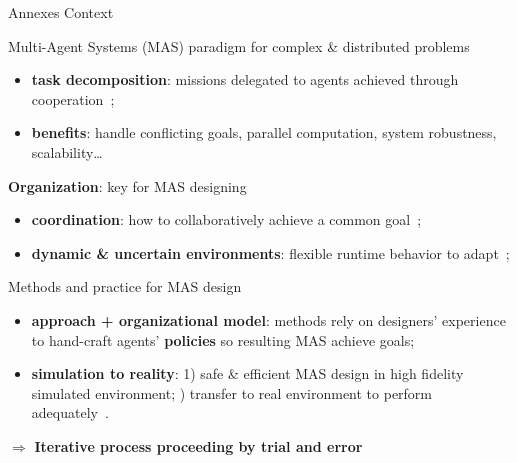 \begin{frame}{Annexes}
    {Context}

    \begin{block}{Multi-Agent Systems (MAS) paradigm for complex \& distributed problems}
        \begin{itemize}
            \item \textbf{task decomposition}: missions delegated to agents achieved through cooperation~\cite{Raileanu2023};
            \item \textbf{benefits}: handle conflicting goals, parallel computation, system robustness, scalability\dots
        \end{itemize}
    \end{block}

    \begin{block}{\textbf{Organization}: key for MAS designing}
        \begin{itemize}
            \item \textbf{coordination}: how to collaboratively achieve a common goal~\cite{Hubner2007};
            \item \textbf{dynamic \& uncertain environments}: flexible runtime behavior to adapt~\cite{Kathleen2020};
        \end{itemize}
    \end{block}

    \begin{block}{Methods and practice for MAS design}
        \begin{itemize}
            \item \textbf{approach + organizational model}: methods rely on designers' experience to hand-craft agents' \textbf{policies} so resulting MAS achieve goals;
            \item \textbf{simulation to reality}: 1) safe \& efficient MAS design in high fidelity simulated environment; ) transfer to real environment to perform adequately~\cite{Schon2021}.
        \end{itemize}
        \vspace{1ex}
        \quad $\Longrightarrow$ \textbf{Iterative process proceeding by trial and error}

    \end{block}

\end{frame}

